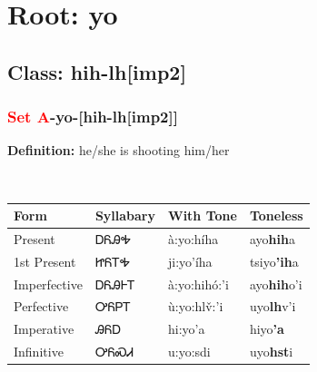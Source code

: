 \needspace{4in}
\section*{Root: yo}
\nopagebreak
{}
\needspace{3in}
\subsection*{Class: hih-lh[imp2]}
\nopagebreak
\needspace{2in}
\subsubsection*{\textcolor{Red}{Set A}{-}\textbf{yo}{-}[hih-lh[imp2]]}
\nopagebreak
\textbf{Definition: } he/she is shooting him/her
\\[0.5em]
\begin{tabularx}{\textwidth}{l X X X}%
\toprule%
\textbf{Form}&\textbf{Syllabary}&\textbf{With Tone}&\textbf{Toneless}\\%
\midrule%
Present&ᎠᏲᎯᎭ&à:yo:híha&ayo\textbf{hih}a\\%
1st Present&ᏥᏲᎢᎭ&ji:yo’íha&tsiyo\textbf{'ih}a\\%
Imperfective&ᎠᏲᎯᎰᎢ&à:yo:hihó:’i&ayo\textbf{hih}o'i\\%
Perfective&ᎤᏲᏢᎢ&ù:yo:hlv̌:’i&uyo\textbf{lh}v'i\\%
Imperative&ᎯᏲᎠ&hi:yo’a&hiyo\textbf{'a}\\%
Infinitive&ᎤᏲᏍᏗ&u:yo:sdi&uyo\textbf{hst}i\\%
\bottomrule%
\end{tabularx}
\\[1em]